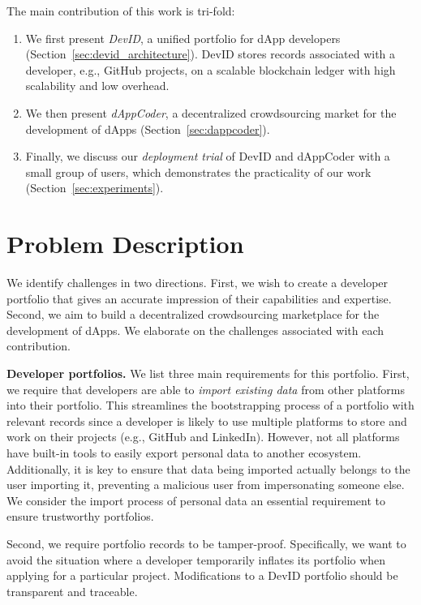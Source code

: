 The main contribution of this work is tri-fold:
\begin{enumerate}
	\item We first present \emph{DevID}, a unified portfolio for dApp developers (Section~\ref{sec:devid_architecture}). DevID stores records associated with a developer, e.g., GitHub projects, on a scalable blockchain ledger with high scalability and low overhead.
	\item We then present \emph{dAppCoder}, a decentralized crowdsourcing market for the development of dApps (Section~\ref{sec:dappcoder}).
	\item Finally, we discuss our \emph{deployment trial} of DevID and dAppCoder with a small group of users, which demonstrates the practicality of our work (Section~\ref{sec:experiments}).
\end{enumerate}

\section{Problem Description}
\label{sec:dappcoder_problem_description}
We identify challenges in two directions.
First, we wish to create a developer portfolio that gives an accurate impression of their capabilities and expertise.
Second, we aim to build a decentralized crowdsourcing marketplace for the development of dApps.
We elaborate on the challenges associated with each contribution.

\textbf{Developer portfolios.}
We list three main requirements for this portfolio.
First, we require that developers are able to \emph{import existing data} from other platforms into their portfolio.
This streamlines the bootstrapping process of a portfolio with relevant records since a developer is likely to use multiple platforms to store and work on their projects (e.g., GitHub and LinkedIn).
However, not all platforms have built-in tools to easily export personal data to another ecosystem.
Additionally, it is key to ensure that data being imported actually belongs to the user importing it, preventing a malicious user from impersonating someone else.
We consider the import process of personal data an essential requirement to ensure trustworthy portfolios.

Second, we require portfolio records to be tamper-proof.
Specifically, we want to avoid the situation where a developer temporarily inflates its portfolio when applying for a particular project.
Modifications to a DevID portfolio should be transparent and traceable.

